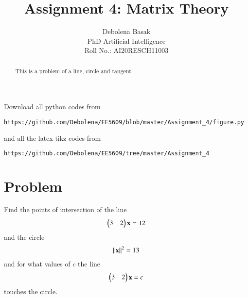 \documentclass[journal,12pt,twocolumn]{IEEEtran}
\begin{document}
\makeatletter
{}
\makeatother
\let\StandardTheFigure\thefigure
\let\vec\mathbf
\renewcommand{\thefigure}{\theproblem}
\def\putbox#1#2#3{\makebox[0in][l]{\makebox[#1][l]{}\raisebox{\baselineskip}[0in][0in]{\raisebox{#2}[0in][0in]{#3}}}}
     \def\rightbox#1{\makebox[0in][r]{#1}}
     \def\centbox#1{\makebox[0in]{#1}}
     \def\topbox#1{\raisebox{-\baselineskip}[0in][0in]{#1}}
     \def\midbox#1{\raisebox{-0.5\baselineskip}[0in][0in]{#1}}
\vspace{3cm}
\title{Assignment 4: Matrix Theory}
\author{Debolena Basak\\PhD Artificial Intelligence\\ Roll No.: AI20RESCH11003}

\maketitle
\newpage
\bigskip
\renewcommand{\thefigure}{\theenumi}
\renewcommand{\thetable}{\theenumi}

\begin{abstract}
This is a problem of a line, circle and tangent.
\end{abstract}

Download all python codes from 

\begin{lstlisting}
https://github.com/Debolena/EE5609/blob/master/Assignment_4/figure.py
\end{lstlisting}
%
and all the latex-tikz codes from 
%
\begin{lstlisting}
https://github.com/Debolena/EE5609/tree/master/Assignment_4
\end{lstlisting}
%
\section{Problem}
Find the points of intersection of the line
\begin{align}
    \label{eq1}\myvec{3 & 2}\vec x = 12
\end{align}
and the circle
\begin{align}
    \label{eq:circle} \norm{\vec{x}}^2 = 13
\end{align}
and for what values of $c$ the line
\begin{align}
    \label{tangent}\myvec{3 &2}\vec x = c 
\end{align}
touches the circle.
%
\end{document}
